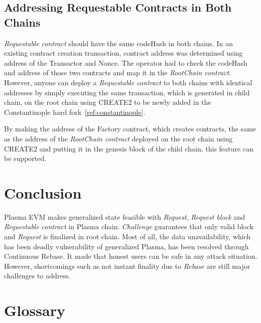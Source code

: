 \documentclass[letterpaper, 11pt]{article}
\begin{document}
\subsection{Addressing Requestable Contracts in Both Chains}
\begin{CJK}{UTF8}{mj}
\emph{Requestable contract} should have the same codeHash in both chains. In an existing contract creation transaction, contract address was determined using address of the Transactor and Nonce. The operator had to check the codeHash and address of those two contracts and map it in the \emph{RootChain contract}. However, anyone can deploy a \emph{Requestable contract} to both chains with identical addresses by simply executing the same transaction, which is generated in child chain, on the root chain using CREATE2 to be newly added in the Constantinople hard fork~\ref{ref:constantinople}.

By making the address of the Factory contract, which creates contracts, the same as the address of the \emph{RootChain contract} deployed on the root chain using CREATE2 and putting it in the genesis block of the child chain, this feature can be supported.
\end{CJK}


\section{Conclusion}
\begin{CJK}{UTF8}{mj}
Plasma EVM makes generalized state feasible with \emph{Request}, \emph{Request block} and \emph{Requestable contract} in Plasma chain. \emph{Challenge} guarantees that only valid block and \emph{Request} is finalized in root chain. Most of all, the data unavailability, which has been deadly vulnerability of generalized Plasma, has been resolved through Continuous Rebase. It made that honest users can be safe in any attack situation. However, shortcomings such as not instant finality due to \emph{Rebase} are still major challenges to address.
\end{CJK}

\newpage


\appendix
\section{Glossary} \label{appendix:glossary}
\end{document}
